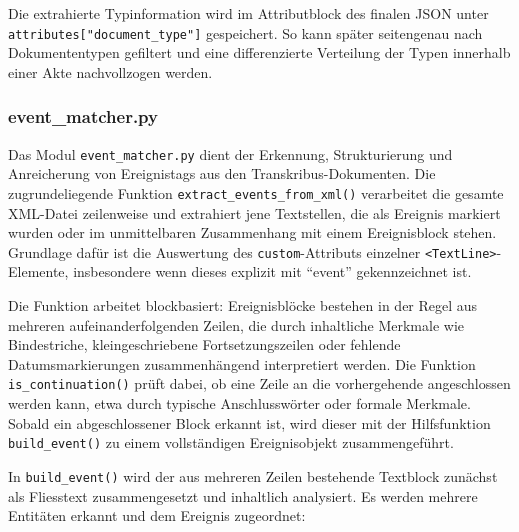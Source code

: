 \documentclass[12pt, a4paper, ngerman, bidi=default]{article}
\newcommand{\code}[1]{\colorbox{VeryLightGray}{\texttt{#1}}} %
\begin{document}
Die extrahierte Typinformation wird im Attributblock des finalen JSON unter \code{attributes["document\_type"]} gespeichert. So kann später seitengenau nach Dokumententypen gefiltert und eine differenzierte Verteilung der Typen innerhalb einer Akte nachvollzogen werden.


\subsubsection*{event\_matcher.py}\label{subsection:event_matcher}

Das Modul \texttt{event\_matcher.py} dient der Erkennung, Strukturierung und Anreicherung von 
Ereignistags aus den Transkribus-Dokumenten. Die zugrundeliegende Funktion \texttt{extract\_events\_from\_xml()} 
verarbeitet die gesamte XML-Datei zeilenweise und extrahiert jene Textstellen, die als Ereignis markiert 
wurden oder im unmittelbaren Zusammenhang mit einem Ereignisblock stehen. Grundlage dafür ist die Auswertung 
des \texttt{custom}-Attributs einzelner \texttt{<TextLine>}-Elemente, insbesondere wenn dieses explizit mit 
\enquote{event} gekennzeichnet ist.

Die Funktion arbeitet blockbasiert: Ereignisblöcke bestehen in der Regel aus mehreren aufeinanderfolgenden 
Zeilen, die durch inhaltliche Merkmale wie Bindestriche, kleingeschriebene Fortsetzungszeilen oder fehlende 
Datumsmarkierungen zusammenhängend interpretiert werden. Die Funktion \texttt{is\_continuation()} prüft dabei, 
ob eine Zeile an die vorhergehende angeschlossen werden kann, etwa durch typische Anschlusswörter oder formale Merkmale. 
Sobald ein abgeschlossener Block erkannt ist, wird dieser mit der Hilfsfunktion \texttt{build\_event()} zu einem 
vollständigen Ereignisobjekt zusammengeführt.

In \texttt{build\_event()} wird der aus mehreren Zeilen bestehende Textblock zunächst als Fliesstext zusammengesetzt 
und inhaltlich analysiert. Es werden mehrere Entitäten erkannt und dem Ereignis zugeordnet:
\end{document}

